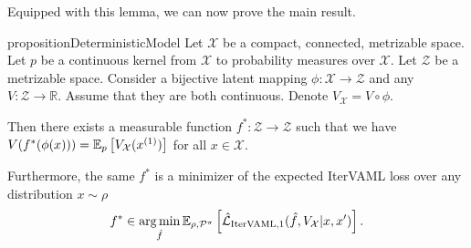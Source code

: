 Equipped with this lemma, we can now prove the main result.

\begin{restatable}{proposition}{DeterministicModel}\label{prop:cvaml:3_1}
    Let $\mathcal{X}$ be a compact, connected, metrizable space. Let $p$ be a continuous kernel from $\mathcal{X}$ to probability measures over $\mathcal{X}$. Let $\mathcal{Z}$ be a metrizable space. Consider a bijective latent mapping $\phi: \mathcal{X} \rightarrow \mathcal{Z}$ and any $V: \mathcal{Z} \rightarrow \mathbb{R}$. Assume that they are both continuous. Denote $V_\mathcal{X} = V \circ \phi$.
    
    Then there exists a measurable function $f^*: \mathcal{Z} \rightarrow \mathcal{Z}$ such that we have $V(f^*(\phi(x))) = \mathbb{E}_{p}\left[  V_\mathcal{X}(x^{(1)}) \right]$ for all $x \in \mathcal{X}$.

    Furthermore, the same $f^*$ is a minimizer of the expected IterVAML loss over any distribution $x \sim \rho$
    $$f^* \in \operatorname*{arg\,min}_{\hat{f}} \mathbb{E}_{\rho,\mathcal{P}^\pi}\left[  \hat{\mathcal{L}}_{\mathrm{IterVAML},1}(\hat{f},V_\mathcal{X}|x,x') \right].$$
\end{restatable}

